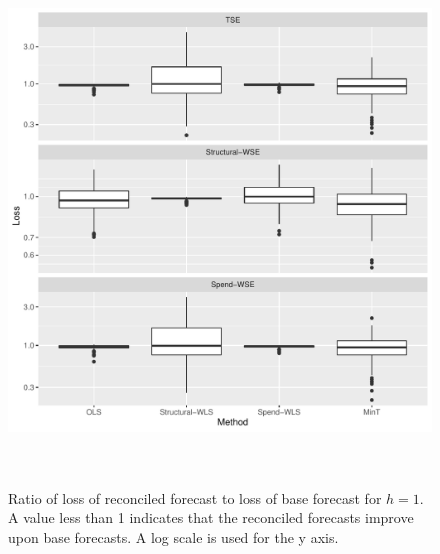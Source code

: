 \documentclass[12pt]{article}
\begin{document}
  	\begin{figure}[!hbt]
	\centering
	\small
	\includegraphics[width = \textwidth, height=14cm]{lossboxplots_5.pdf}
	\caption{Ratio of loss of reconciled forecast to loss of base forecast for $h = 1$. A value less than 1 indicates that the reconciled forecasts improve upon base forecasts.  A log scale is used for the y axis.}
	\label{fig:BaseVSRecon_Fch5}
\end{figure}
\end{document}
